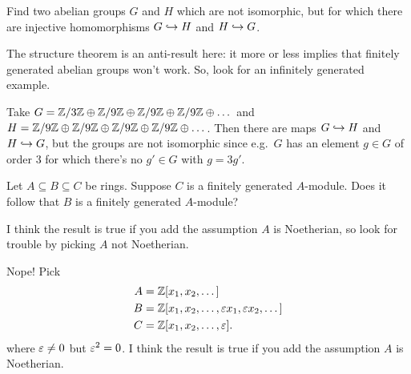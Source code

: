 \begin{problem}
	\onechili
	Find two abelian groups $G$ and $H$ which are not isomorphic,
	but for which there are injective homomorphisms
	$G \hookrightarrow H$ and $H \hookrightarrow G$.
	\begin{hint}
		The structure theorem is an anti-result here:
		it more or less implies that finitely generated abelian groups won't work.
		So, look for an infinitely generated example.
	\end{hint}
	\begin{sol}
		Take $G = \mathbb Z/3\mathbb Z \oplus \mathbb Z/9\mathbb Z \oplus \mathbb Z/9\mathbb Z \oplus \mathbb Z/9\mathbb Z \oplus \dots$
		and $H = \mathbb Z/9\mathbb Z \oplus \mathbb Z/9\mathbb Z \oplus \mathbb Z/9\mathbb Z \oplus \mathbb Z/9\mathbb Z \oplus \dots$.
		Then there are maps $G \hookrightarrow H$ and $H \hookrightarrow G$,
		but the groups are not isomorphic since e.g.\
		$G$ has an element $g \in G$ of order $3$
		for which there's no $g' \in G$ with $g = 3g'$.
	\end{sol}
\end{problem}

\begin{problem} %
	\twochili
	Let $A \subseteq B \subseteq C$ be rings.
	Suppose $C$ is a finitely generated $A$-module.
	Does it follow that $B$ is a finitely generated $A$-module?
	\begin{hint}
		I think the result is true if you add the assumption $A$ is Noetherian,
		so look for trouble by picking $A$ not Noetherian.
	\end{hint}
	\begin{sol}
		Nope! Pick
		\begin{align*}
			A &= \mathbb Z[x_1, x_2, \dots] \\
			B &= \mathbb Z[x_1, x_2, \dots, \varepsilon x_1, \varepsilon x_2, \dots] \\
			C &= \mathbb Z[x_1, x_2, \dots, \varepsilon].
		\end{align*}
		where $\varepsilon \neq 0$ but $\varepsilon^2 = 0$.
		I think the result is true if you add the assumption $A$ is Noetherian.
	\end{sol}
\end{problem}
